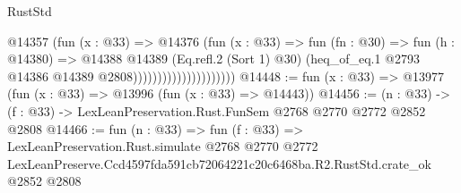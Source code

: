 \begin{lexlean}{RustStd}
\begin{coremodule}
                                      @14357
                                        (fun (x : @33) =>
                                        @14376
                                          (fun (x : @33) =>
                                          fun (fn : @30) =>
                                          fun (h : @14380) =>
                                          @14388
                                            @14389
                                            (Eq.refl.{2} (Sort 1) @30)
                                            (heq_of_eq.{1}
                                              @2793
                                              @14386
                                              @14389
                                              @2808)))))))))))))))))))))
@14448 := fun (x : @33) => @13977 (fun (x : @33) => @13996 (fun (x : @33) => @14443))
@14456 := (n : @33) -> (f : @33) -> LexLeanPreservation.Rust.FunSem @2768 @2770 @2772 @2852 @2808
@14466 := fun (n : @33) =>
  fun (f : @33) =>
  LexLeanPreservation.Rust.simulate
    @2768
    @2770
    @2772
    LexLeanPreserve.Ccd4597fda591cb72064221c20c6468ba.R2.RustStd.crate_ok
    @2852
    @2808
\end{coremodule}
\end{lexlean}
